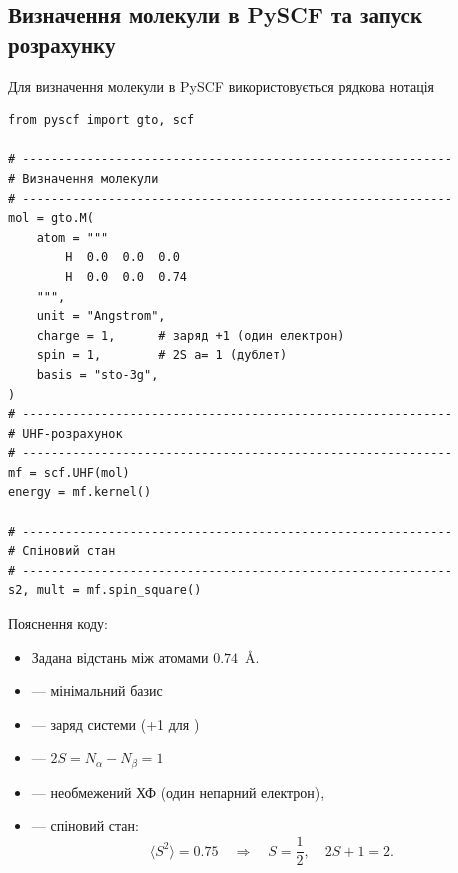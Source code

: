 \subsection{Визначення молекули в PySCF та запуск розрахунку}

Для визначення молекули в PySCF використовується рядкова нотація
\begin{verbatim}
from pyscf import gto, scf

# ------------------------------------------------------------
# Визначення молекули
# ------------------------------------------------------------
mol = gto.M(
    atom = """
        H  0.0  0.0  0.0
        H  0.0  0.0  0.74
    """,
    unit = "Angstrom",
    charge = 1,      # заряд +1 (один електрон)
    spin = 1,        # 2S a= 1 (дублет)
    basis = "sto-3g",
)
# ------------------------------------------------------------
# UHF-розрахунок
# ------------------------------------------------------------
mf = scf.UHF(mol)
energy = mf.kernel()

# ------------------------------------------------------------
# Спіновий стан
# ------------------------------------------------------------
s2, mult = mf.spin_square()
\end{verbatim}

Пояснення коду:
\begin{itemize}
	\item Задана відстань між атомами $0.74$~\AA.
	\item {} --- мінімальний базис
	\item {} --- заряд системи (+1 для )
	\item {} --- $2S = N_\alpha - N_\beta = 1$
	\item {} --- необмежений ХФ (один непарний електрон),
	\item {} --- спіновий стан:
	      \[
		      \langle S^2 \rangle = 0.75 \quad \Rightarrow \quad S = \frac{1}{2}, \quad 2S+1 = 2.
	      \]
\end{itemize}

